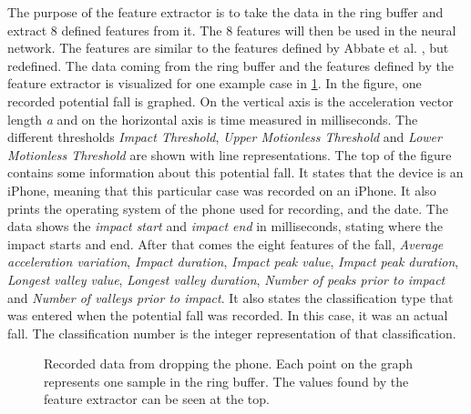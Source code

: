 \documentclass[12pt, a4paper, onecolumn]{article}
\begin{document}
	The purpose of the feature extractor is to take the data in the ring buffer and extract 8 defined features from it. The 8 features will then be used in the neural network. The features are similar to the features defined by Abbate et al. \cite{piza_uni}, but redefined. The data coming from the ring buffer and the features defined by the feature extractor is visualized for one example case in \ref{fig:fall-data-example}. In the figure, one recorded potential fall is graphed. On the vertical axis is the acceleration vector length \textit{a} and on the horizontal axis is time measured in milliseconds. The different thresholds \textit{Impact Threshold}, \textit{Upper Motionless Threshold} and \textit{Lower Motionless Threshold} are shown with line representations. The top of the figure contains some information about this potential fall. It states that the device is an iPhone, meaning that this particular case was recorded on an iPhone. It also prints the operating system of the phone used for recording, and the date. The data shows the \textit{impact start} and \textit{impact end} in milliseconds, stating where the impact starts and end. After that comes the eight features of the fall, \textit{Average acceleration variation}, \textit{Impact duration}, \textit{Impact peak value}, \textit{Impact peak duration}, \textit{Longest valley value}, \textit{Longest valley duration}, \textit{Number of peaks prior to impact} and \textit{Number of valleys prior to impact}. It also states the classification type that was entered when the potential fall was recorded. In this case, it was an actual fall. The classification number is the integer representation of that classification. 
	
	\begin{figure}[H]
		\centering
		\caption{Recorded data from dropping the phone. Each point on the graph represents one sample in the ring buffer. The values found by the feature extractor can be seen at the top.}%
		\label{fig:fall-data-example}%
	\end{figure}
	
\end{document}
